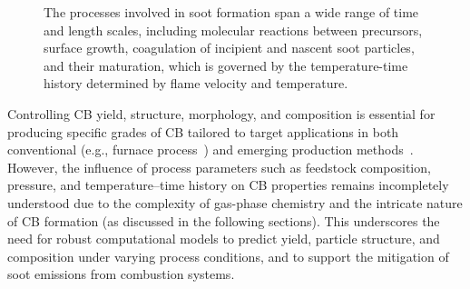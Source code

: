 \begin{figure}[H]
	\centering
	\caption{The processes involved in soot formation span a wide range of time and length scales, including molecular reactions between precursors, surface growth, coagulation of incipient and nascent soot particles, and their maturation, which is governed by the temperature-time history determined by flame velocity and temperature.}
	\label{fig:sootscales}
\end{figure}



Controlling CB yield, structure, morphology, and composition is essential for producing specific grades of CB tailored to target applications in both conventional (e.g., furnace process~\citep{dames2023plasma}) and emerging production methods~\citep{li2017experimental, fulcheri2023energy, patlolla2023review}. However, the influence of process parameters such as feedstock composition, pressure, and temperature–time history on CB properties remains incompletely understood due to the complexity of gas-phase chemistry and the intricate nature of CB formation (as discussed in the following sections). This underscores the need for robust computational models to predict yield, particle structure, and composition under varying process conditions, and to support the mitigation of soot emissions from combustion systems.


